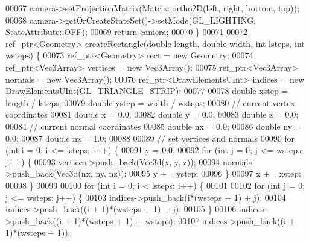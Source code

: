 \begin{DoxyCode}
00067         camera->setProjectionMatrix(Matrix::ortho2D(left, right, bottom, top));
00068         camera->getOrCreateStateSet()->setMode(GL\_LIGHTING, StateAttribute::OFF);
00069         \textcolor{keywordflow}{return} camera;
00070     \}
00071 
\hypertarget{_util_functions_8cpp_source_l00072}{}\hyperlink{namespacebrtr_a793c6ef7f57632fc5ac280b94f60dd65}{00072}     ref\_ptr<Geometry> \hyperlink{namespacebrtr_a793c6ef7f57632fc5ac280b94f60dd65}{createRectangle}(\textcolor{keywordtype}{double} length, \textcolor{keywordtype}{double} width, \textcolor{keywordtype}{int} lsteps, \textcolor{keywordtype}{int} wsteps) \{
00073         ref\_ptr<Geometry> rect = \textcolor{keyword}{new} Geometry;
00074         ref\_ptr<Vec3Array> vertices = \textcolor{keyword}{new} Vec3Array();
00075         ref\_ptr<Vec3Array> normals = \textcolor{keyword}{new} Vec3Array();
00076         ref\_ptr<DrawElementsUInt> indices = \textcolor{keyword}{new} DrawElementsUInt(GL\_TRIANGLE\_STRIP);
00077 
00078         \textcolor{keywordtype}{double} xstep = length / lsteps;
00079         \textcolor{keywordtype}{double} ystep = width / wsteps;
00080         \textcolor{comment}{// current vertex coordinates}
00081         \textcolor{keywordtype}{double} x = 0.0;
00082         \textcolor{keywordtype}{double} y = 0.0;
00083         \textcolor{keywordtype}{double} z = 0.0;
00084         \textcolor{comment}{//  current normal coordinates}
00085         \textcolor{keywordtype}{double} nx = 0.0;
00086         \textcolor{keywordtype}{double} ny = 0.0;
00087         \textcolor{keywordtype}{double} nz = 1.0;
00088 
00089         \textcolor{comment}{// set vertices and normals}
00090         \textcolor{keywordflow}{for} (\textcolor{keywordtype}{int} i = 0; i <= lsteps; i++) \{
00091             y = 0.0;
00092             \textcolor{keywordflow}{for} (\textcolor{keywordtype}{int} j = 0; j <= wsteps; j++) \{
00093                 vertices->push\_back(Vec3d(x, y, z));
00094                 normals->push\_back(Vec3d(nx, ny, nz));
00095                 y += ystep;
00096             \}
00097             x += xstep;
00098         \}
00099 
00100         \textcolor{keywordflow}{for} (\textcolor{keywordtype}{int} i = 0; i < lsteps; i++) \{
00101 
00102             \textcolor{keywordflow}{for} (\textcolor{keywordtype}{int} j = 0; j <= wsteps; j++) \{
00103                 indices->push\_back(i*(wsteps + 1) + j);
00104                 indices->push\_back((i + 1)*(wsteps + 1) + j);
00105             \}
00106             indices->push\_back((i + 1)*(wsteps + 1) + wsteps);
00107             indices->push\_back((i + 1)*(wsteps + 1));

\end{DoxyCode}

